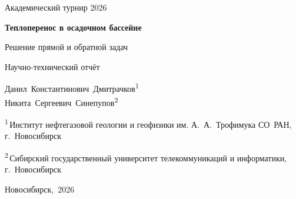 \thispagestyle{empty}
\begingroup
\centering
{\large Академический турнир 2026\par}

\vfill
{\LARGE\bfseries Теплоперенос в осадочном бассейне\par}
\vspace{0.5cm}
{\Large Решение прямой и обратной задач\par}
\vspace{1cm}
{\large Научно-технический отчёт\par}

\vfill
{\large Данил~Константинович~Дмитрачков\textsuperscript{1}\\[0.35em] Никита~Сергеевич~Синепупов\textsuperscript{2}\par}
\vspace{0.6cm}
{\small
\textsuperscript{1}\,Институт нефтегазовой геологии и геофизики им. А.~А.~Трофимука СО~РАН, г.~Новосибирск\par
\vspace{0.3cm}
\textsuperscript{2}\,Сибирский государственный университет телекоммуникаций и информатики, г.~Новосибирск\par}

\vfill
Новосибирск,~2026\par
\endgroup
\clearpage
